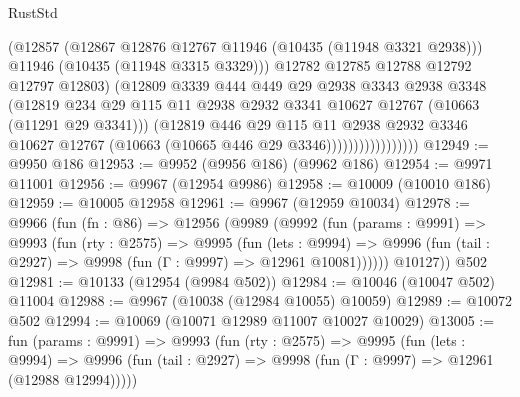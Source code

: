 \begin{lexlean}{RustStd}
\begin{coremodule}
                                (@12857
                                  (@12867 @12876 @12767 @11946 (@10435 (@11948 @3321 @2938)))
                                  @11946
                                  (@10435 (@11948 @3315 @3329)))
                                @12782
                                @12785
                                @12788
                                @12792
                                @12797
                                @12803)
                              (@12809
                                @3339
                                @444
                                @449
                                @29
                                @2938
                                @3343
                                @2938
                                @3348
                                (@12819
                                  @234
                                  @29
                                  @115
                                  @11
                                  @2938
                                  @2932
                                  @3341
                                  @10627
                                  @12767
                                  (@10663 (@11291 @29 @3341)))
                                (@12819
                                  @446
                                  @29
                                  @115
                                  @11
                                  @2938
                                  @2932
                                  @3346
                                  @10627
                                  @12767
                                  (@10663 (@10665 @446 @29 @3346)))))))))))))))))
@12949 := @9950 @186
@12953 := @9952 (@9956 @186) (@9962 @186)
@12954 := @9971 @11001
@12956 := @9967 (@12954 @9986)
@12958 := @10009 (@10010 @186)
@12959 := @10005 @12958
@12961 := @9967 (@12959 @10034)
@12978 := @9966
    (fun (fn : @86) =>
    @12956
      (@9989
        (@9992
          (fun (params : @9991) =>
          @9993
            (fun (rty : @2575) =>
            @9995
              (fun (lets : @9994) =>
              @9996 (fun (tail : @2927) => @9998 (fun (Γ : @9997) => @12961 @10081))))))
        @10127))
    @502
@12981 := @10133 (@12954 (@9984 @502))
@12984 := @10046 (@10047 @502) @11004
@12988 := @9967 (@10038 (@12984 @10055) @10059)
@12989 := @10072 @502
@12994 := @10069 (@10071 @12989 @11007 @10027 @10029)
@13005 := fun (params : @9991) =>
  @9993
    (fun (rty : @2575) =>
    @9995
      (fun (lets : @9994) =>
      @9996 (fun (tail : @2927) => @9998 (fun (Γ : @9997) => @12961 (@12988 @12994)))))

\end{coremodule}
\end{lexlean}
